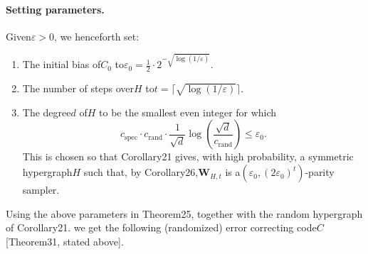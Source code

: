 \paragraph{Setting parameters.} Given$\varepsilon>0$, we henceforth set:
\begin{enumerate}
\item The initial bias of$C_0$ to$\varepsilon_0=\frac12\cdot2^{-\sqrt{\log(1/\varepsilon)}}$.
\item The number of steps over$H$ to$t=\lceil\sqrt{\log(1/\varepsilon)}\rceil$.
\item The degree$d$ of$H$ to be the smallest even integer for which
\[c_{\mathrm{spec}}\cdot c_{\mathrm{rand}}\cdot\frac1{\sqrt d}\log\left(\frac{\sqrt d}{c_{\mathrm{rand}}}\right)\leq\varepsilon_0.\]
This is chosen so that Corollary21 gives, with high probability, a symmetric hypergraph$H$ such that, by Corollary26,$\mathbf W_{H,t}$ is a$(\varepsilon_0,(2\varepsilon_0)^t)$-parity sampler.
\end{enumerate}
Using the above parameters in Theorem25, together with the random hypergraph of Corollary21. we get the following (randomized) error correcting code$C$ [Theorem31, stated above].
